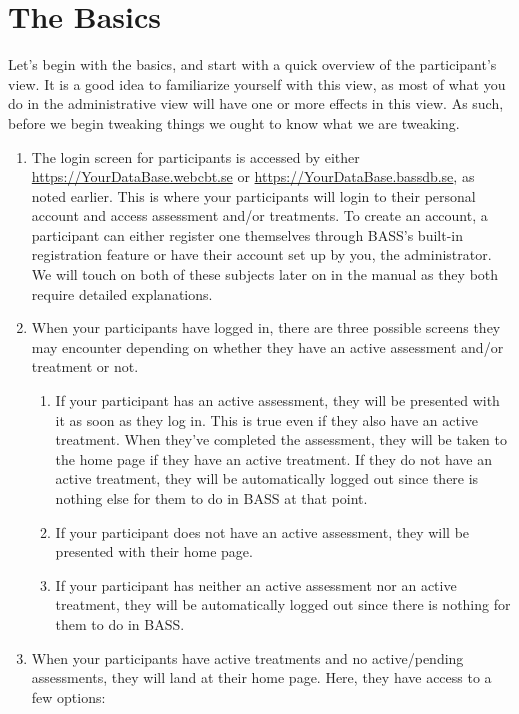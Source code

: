 \documentclass[]{book}
\providecommand{\tightlist}{%
  \setlength{\itemsep}{0pt}\setlength{\parskip}{0pt}}
\begin{document}
\hypertarget{the-basics}{%
\chapter{The Basics}\label{the-basics}}

Let's begin with the basics, and start with a quick overview of the participant's view. It is a good idea to familiarize yourself with this view, as most of what you do in the administrative view will have one or more effects in this view. As such, before we begin tweaking things we ought to know what we are tweaking.

\begin{enumerate}
\def\labelenumi{\arabic{enumi}.}
\tightlist
\item
  The login screen for participants is accessed by either \url{https://YourDataBase.webcbt.se} or \url{https://YourDataBase.bassdb.se}, as noted earlier. This is where your participants will login to their personal account and access assessment and/or treatments. To create an account, a participant can either register one themselves through BASS's built-in registration feature or have their account set up by you, the administrator. We will touch on both of these subjects later on in the manual as they both require detailed explanations.
\item
  When your participants have logged in, there are three possible screens they may encounter depending on whether they have an active assessment and/or treatment or not.

  \begin{enumerate}
  \def\labelenumii{\arabic{enumii}.}
  \tightlist
  \item
    If your participant has an active assessment, they will be presented with it as soon as they log in. This is true even if they also have an active treatment. When they've completed the assessment, they will be taken to the home page if they have an active treatment. If they do not have an active treatment, they will be automatically logged out since there is nothing else for them to do in BASS at that point.
  \item
    If your participant does not have an active assessment, they will be presented with their home page.
  \item
    If your participant has neither an active assessment nor an active treatment, they will be automatically logged out since there is nothing for them to do in BASS.
  \end{enumerate}
\item
  When your participants have active treatments and no active/pending assessments, they will land at their home page. Here, they have access to a few options:


\end{enumerate}
\end{document}
